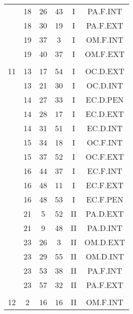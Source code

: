 \documentclass[12pt, a4paper]{article}
\begin{document}
\begin{multicols}{3}
{\begin{tabular}{c c c c c c}
	 	 	 	 & 18 & 26 & 43 & I & PA.F.INT\\%
	 	 	 	 & 18 & 30 & 19 & I & PA.F.EXT\\%
	 	 	 	 & 19 & 37 & 3 & I & OM.F.INT\\%
	 	 	 	 & 19 & 40 & 37 & I & OM.F.EXT\\%
	 	 	 	 & & & & & \\%
	 	 	 	11 & 13 & 17 & 54 & I & OC.D.EXT\\%
	 	 	 	 & 13 & 21 & 30 & I & OC.D.INT\\%
	 	 	 	 & 14 & 27 & 33 & I & EC.D.PEN\\%
	 	 	 	 & 14 & 28 & 17 & I & EC.D.EXT\\%
	 	 	 	 & 14 & 31 & 51 & I & EC.D.INT\\%
	 	 	 	 & 15 & 34 & 18 & I & OC.F.INT\\%
	 	 	 	 & 15 & 37 & 52 & I & OC.F.EXT\\%
	 	 	 	 & 16 & 44 & 37 & I & EC.F.INT\\%
	 	 	 	 & 16 & 48 & 11 & I & EC.F.EXT\\%
	 	 	 	 & 16 & 48 & 53 & I & EC.F.PEN\\%
	 	 	 	 & 21 & 5 & 52 & II & PA.D.EXT\\%
	 	 	 	 & 21 & 9 & 48 & II & PA.D.INT\\%
	 	 	 	 & 23 & 26 & 3 & II & OM.D.EXT\\%
	 	 	 	 & 23 & 29 & 55 & II & OM.D.INT\\%
	 	 	 	 & 23 & 53 & 38 & II & PA.F.INT\\%
	 	 	 	 & 23 & 57 & 32 & II & PA.F.EXT\\%
	 	 	 	 & & & & & \\%
	 	 	 	12 & 2 & 16 & 16 & II & OM.F.INT\\%
	 	 \end{tabular}
 	}
\end{multicols}
\end{document}
